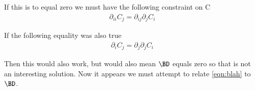 \documentclass{article}
\begin{document}
If this is to equal zero we must have the following constraint on C
\begin{align}\label{eqn:blah}
\partial_{ii} C_j = \partial_{ij} \partial_j C_i
\end{align}

If the following equality was also true
\begin{align*}
\partial_{i} C_j = \partial_{j} \partial_j C_i
\end{align*}

Then this would also work, but would also mean $\BD$ equals zero so that is not an interesting solution.  Now it appears we must attempt to relate
\ref{eqn:blah} to $\BD$.



\end{document}
